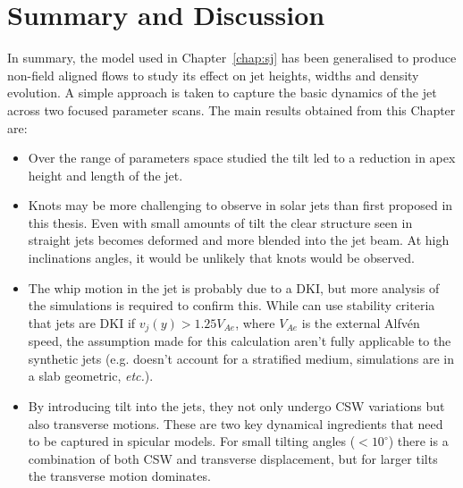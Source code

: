 \documentclass[12pt]{ociamthesis}
\newcommand{\Alfven}{Alfv\'{e}n }
\newcommand{\degs}{^{\circ}}
\begin{document}
\section{Summary and Discussion}
\label{sec:sum}
In summary, the model used in Chapter~\ref{chap:sj} has been generalised to produce non-field aligned flows to study its effect on jet heights, widths and density evolution. A simple approach is taken to capture the basic dynamics of the jet across two focused parameter scans. The main results obtained from this Chapter are:   
\begin{itemize}
\item Over the range of parameters space studied the tilt led to a reduction in apex height and length of the jet.
\item Knots may be more challenging to observe in solar jets than first proposed in this thesis. Even with small amounts of tilt the clear structure seen in straight jets becomes deformed and more blended into the jet beam. At high inclinations angles, it would be unlikely that knots would be observed. 
\item The whip motion in the jet is probably due to a DKI, but more analysis of the simulations is required to confirm this. While can use stability criteria that jets are DKI if $v_j(y)>1.25 V_{Ae}$, where $V_{Ae}$ is the external \Alfven speed, the assumption made for this calculation aren't fully applicable to the synthetic jets {\color{green}(e.g. doesn't account for a stratified medium, simulations are in a slab geometric, \textit{etc.})}.
\item By introducing tilt into the jets, they not only undergo CSW variations but also transverse motions. These are two key dynamical ingredients that need to be captured in spicular models. For small tilting angles ($<10\degs$) there is a combination of both CSW and transverse displacement, but for larger tilts the transverse motion dominates.
\end{itemize}
\end{document}
